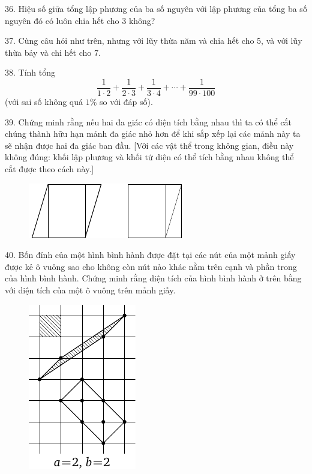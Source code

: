 \begin{problem}{36.}
	Hiệu số giữa tổng lập phương của ba số nguyên với lập phương của tổng ba số nguyên đó có luôn chia hết cho $3$ không?
\end{problem}

\begin{problem}{37.}
	Cùng câu hỏi như trên, nhưng với lũy thừa năm và chia hết cho $5$, và với lũy thừa bảy và chi hết cho $7$.
\end{problem}

\begin{problem}{38.}
	Tính tổng
	\begin{equation*}
		\frac{1}{1\cdot 2} + \frac{1}{2\cdot 3} + \frac{1}{3\cdot 4} + \dotsb + \frac{1}{99\cdot 100}
	\end{equation*}
	(với sai số không quá $1\%$ so với đáp số).
\end{problem}

\begin{problem}{39.}
	Chứng minh rằng nếu hai đa giác có diện tích bằng nhau thì ta có thể cắt chúng thành hữu hạn mảnh đa giác nhỏ hơn để khi sắp xếp lại các mảnh này ta sẽ nhận được hai đa giác ban đầu. [Với các vật thể trong không gian, điều này không đúng: khối lập phương và khối tứ diện có thể tích bằng nhau không thể cắt được theo cách này.]
	\begin{figure}
		\includegraphics{resources/q39_horizontal}
	\end{figure}
\end{problem}

\begin{problem}{40.}
	Bốn đỉnh của một hình bình hành được đặt tại các nút của một mảnh giấy được kẻ ô vuông sao cho không còn nút nào khác nằm trên cạnh và phần trong của hình bình hành. Chứng minh rằng diện tích của hình bình hành ở trên bằng với diện tích của một ô vuông trên mảnh giấy.
	\begin{figure}
		\includegraphics{resources/taskbook-24}
	\end{figure}
\end{problem}


